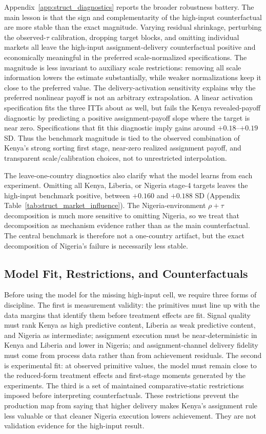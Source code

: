 \documentclass[11pt]{article}
\begin{document}
Appendix~\ref{app:struct_diagnostics} reports the broader robustness battery. The main lesson is that the sign and complementarity of the high-input counterfactual are more stable than the exact magnitude. Varying residual shrinkage, perturbing the observed-$\tau$ calibration, dropping target blocks, and omitting individual markets all leave the high-input assignment-delivery counterfactual positive and economically meaningful in the preferred scale-normalized specifications. The magnitude is less invariant to auxiliary scale restrictions: removing all scale information lowers the estimate substantially, while weaker normalizations keep it close to the preferred value. The delivery-activation sensitivity explains why the preferred nonlinear payoff is not an arbitrary extrapolation. A linear activation specification fits the three ITTs about as well, but fails the Kenya revealed-payoff diagnostic by predicting a positive assignment-payoff slope where the target is near zero. Specifications that fit this diagnostic imply gains around $+0.18$--$+0.19$ SD. Thus the benchmark magnitude is tied to the observed combination of Kenya's strong sorting first stage, near-zero realized assignment payoff, and transparent scale/calibration choices, not to unrestricted interpolation.

The leave-one-country diagnostics also clarify what the model learns from each experiment. Omitting all Kenya, Liberia, or Nigeria stage-4 targets leaves the high-input benchmark positive, between $+0.160$ and $+0.188$ SD (Appendix Table~\ref{tab:struct_market_influence}). The Nigeria-environment $\rho+\tau$ decomposition is much more sensitive to omitting Nigeria, so we treat that decomposition as mechanism evidence rather than as the main counterfactual. The central benchmark is therefore not a one-country artifact, but the exact decomposition of Nigeria's failure is necessarily less stable.

\subsection{Model Fit, Restrictions, and Counterfactuals}
\label{subsec:struct_acceptance}

Before using the model for the missing high-input cell, we require three forms of discipline. The first is measurement validity: the primitives must line up with the data margins that identify them before treatment effects are fit. Signal quality must rank Kenya as high predictive content, Liberia as weak predictive content, and Nigeria as intermediate; assignment execution must be near-deterministic in Kenya and Liberia and lower in Nigeria; and assignment-channel delivery fidelity must come from process data rather than from achievement residuals. The second is experimental fit: at observed primitive values, the model must remain close to the reduced-form treatment effects and first-stage moments generated by the experiments. The third is a set of maintained comparative-static restrictions imposed before interpreting counterfactuals. These restrictions prevent the production map from saying that higher delivery makes Kenya's assignment rule less valuable or that cleaner Nigeria execution lowers achievement. They are not validation evidence for the high-input result.
\end{document}
